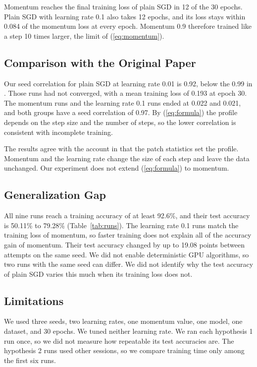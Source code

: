 \documentclass[conference]{IEEEtran}
\begin{document}
Momentum reaches the final training loss of plain SGD in 12 of the 30 epochs.
Plain SGD with learning rate 0.1 also takes 12 epochs, and its loss stays
within 0.084 of the momentum loss at every epoch. Momentum 0.9 therefore
trained like a step 10 times larger, the limit of (\ref{eq:momentum}).

\subsection{Comparison with the Original Paper}
Our seed correlation for plain SGD at learning rate 0.01 is 0.92, below the
0.99 in \cite{chowers2023}. Those runs had not converged, with a mean training
loss of 0.193 at epoch 30. The momentum runs and the learning rate 0.1 runs
ended at 0.022 and 0.021, and both groups have a seed correlation of 0.97. By
(\ref{eq:formula}) the profile depends on the step size and the number of
steps, so the lower correlation is consistent with incomplete training.

The results agree with the account in \cite{chowers2023} that the patch
statistics set the profile. Momentum and the learning rate change the size of
each step and leave the data unchanged. Our experiment does not extend
(\ref{eq:formula}) to momentum.

\subsection{Generalization Gap}
All nine runs reach a training accuracy of at least 92.6\%, and their test
accuracy is 50.11\% to 79.28\% (Table~\ref{tab:runs}). The learning rate 0.1
runs match the training loss of momentum, so faster training does not explain
all of the accuracy gain of momentum. Their test accuracy changed by up to
19.08 points between attempts on the same seed. We did not enable
deterministic GPU algorithms, so two runs with the same seed can differ. We
did not identify why the test accuracy of plain SGD varies this much when its
training loss does not.

\subsection{Limitations}
We used three seeds, two learning rates, one momentum value, one model, one
dataset, and 30 epochs. We tuned neither learning rate. We ran each hypothesis
1 run once, so we did not measure how repeatable its test accuracies are. The
hypothesis 2 runs used other sessions, so we compare training time only among
the first six runs.
\end{document}

